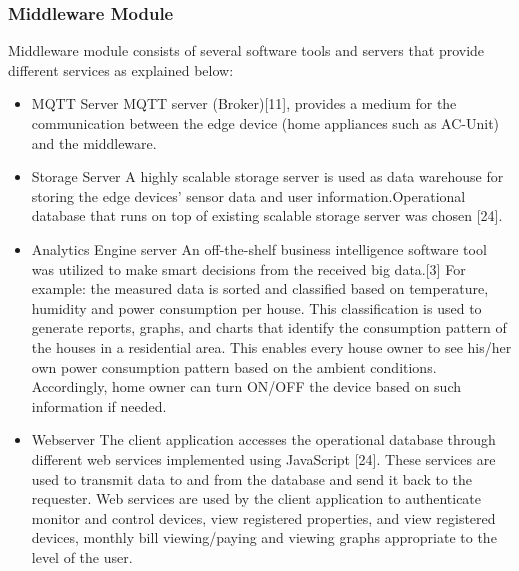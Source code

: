 \documentclass[a4paper,12pt,oneside]{article}
\begin{document}
\subsubsection{Middleware Module}
Middleware module consists of several software tools and
servers that provide different services as explained below:
\begin{itemize}
    \item MQTT Server
    \newline
    MQTT server (Broker)[11], provides a medium for the
    communication between the edge device (home
    appliances such as AC-Unit) and the middleware.
    \item Storage Server\newline
    A highly scalable storage server is used as data
    warehouse for storing the edge devices’ sensor data and
    user information.Operational database that runs on
    top of existing scalable storage server was chosen [24].
    \item Analytics Engine server \newline
    An off-the-shelf business intelligence software tool was
    utilized to make smart decisions from the received big
    data.[3] \newline For example: the measured data is sorted and
    classified based on temperature, humidity and power
    consumption per house. This classification is used to
    generate reports, graphs, and charts that identify the
    consumption pattern of the houses in a residential area.
    This enables every house owner to see his/her own power
    consumption pattern based on the ambient conditions.
    Accordingly, home owner can turn ON/OFF the device
    based on such information if needed.
    \item Webserver \newline
      The client application accesses the operational database
    through different web services implemented using
    JavaScript [24]. These services are used to transmit data
    to and from the database and send it back to the
    requester. Web services are used by the client application
    to authenticate monitor and control devices, view
    registered properties, and view registered devices,
    monthly bill viewing/paying and viewing graphs
    appropriate to the level of the user.
    
\end{itemize}
\end{document}
